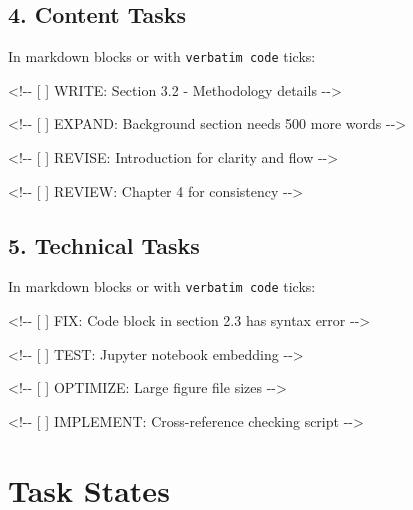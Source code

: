 \documentclass[
  11pt,
  letterpaper,
]{book}
\newenvironment{Shaded}{\begin{snugshade}}{\end{snugshade}}
\newcommand{\AlertTok}[1]{\textcolor[rgb]{0.68,0.00,0.00}{#1}}
\newcommand{\CommentTok}[1]{\textcolor[rgb]{0.37,0.37,0.37}{#1}}
\begin{document}
\subsection*{4. Content Tasks}\label{content-tasks}

In markdown blocks or with \texttt{verbatim\ code} ticks:

\begin{Shaded}
\begin{Highlighting}[]
\CommentTok{\textless{}!{-}{-} [ ] WRITE: Section 3.2 {-} Methodology details {-}{-}\textgreater{}}

\CommentTok{\textless{}!{-}{-} [ ] EXPAND: Background section needs 500 more words {-}{-}\textgreater{}}

\CommentTok{\textless{}!{-}{-} [ ] REVISE: Introduction for clarity and flow {-}{-}\textgreater{}}

\CommentTok{\textless{}!{-}{-} [ ] REVIEW: Chapter 4 for consistency {-}{-}\textgreater{}}
\end{Highlighting}
\end{Shaded}

\subsection*{5. Technical Tasks}\label{technical-tasks}

In markdown blocks or with \texttt{verbatim\ code} ticks:

\begin{Shaded}
\begin{Highlighting}[]
\CommentTok{\textless{}!{-}{-} [ ] FIX: Code block in section 2.3 has syntax error {-}{-}\textgreater{}}

\CommentTok{\textless{}!{-}{-} [ ] }\AlertTok{TEST}\CommentTok{: Jupyter notebook embedding {-}{-}\textgreater{}}

\CommentTok{\textless{}!{-}{-} [ ] OPTIMIZE: Large figure file sizes {-}{-}\textgreater{}}

\CommentTok{\textless{}!{-}{-} [ ] IMPLEMENT: Cross{-}reference checking script {-}{-}\textgreater{}}
\end{Highlighting}
\end{Shaded}

\section*{Task States}\label{task-states}
\end{document}
